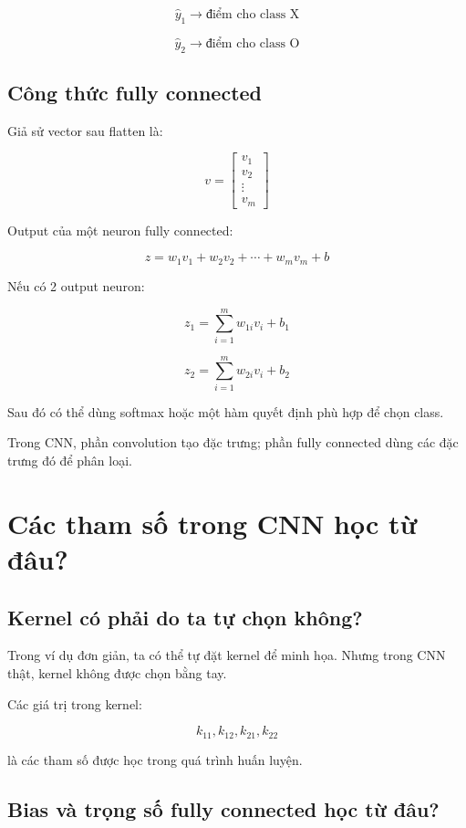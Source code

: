 \documentclass[12pt,a4paper]{report}
\begin{document}
\[
    \hat{y}_1
    \rightarrow
    \text{điểm cho class X}
\]

\[
    \hat{y}_2
    \rightarrow
    \text{điểm cho class O}
\]

\section{Công thức fully connected}

Giả sử vector sau flatten là:

\[
    v =
    \begin{bmatrix}
    v_1\\v_2\\ \vdots\\v_m
    \end{bmatrix}
\]

Output của một neuron fully connected:

\[
    z =
    w_1v_1+w_2v_2+\cdots+w_mv_m+b
\]

Nếu có 2 output neuron:

\[
    z_1 =
    \sum_{i=1}^{m}w_{1i}v_i+b_1
\]

\[
    z_2 =
    \sum_{i=1}^{m}w_{2i}v_i+b_2
\]

Sau đó có thể dùng softmax hoặc một hàm quyết định phù hợp để chọn class.

\begin{ghinho}
Trong CNN, phần convolution tạo đặc trưng; phần fully connected dùng các đặc trưng đó để phân loại.
\end{ghinho}

\chapter{Các tham số trong CNN học từ đâu?}

\section{Kernel có phải do ta tự chọn không?}

Trong ví dụ đơn giản, ta có thể tự đặt kernel để minh họa. Nhưng trong CNN thật, kernel không được chọn bằng tay.

Các giá trị trong kernel:

\[
    k_{11},k_{12},k_{21},k_{22}
\]

là các tham số được học trong quá trình huấn luyện.

\section{Bias và trọng số fully connected học từ đâu?}
\end{document}
